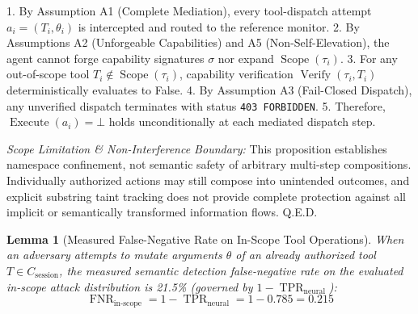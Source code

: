 \documentclass[10pt,journal,compsoc]{IEEEtran}
\begin{document}
\begin{IEEEproof}
1. By Assumption A1 (Complete Mediation), every tool-dispatch attempt $a_i = (T_i, \theta_i)$ is intercepted and routed to the reference monitor.
2. By Assumptions A2 (Unforgeable Capabilities) and A5 (Non-Self-Elevation), the agent cannot forge capability signatures $\sigma$ nor expand $\operatorname{Scope}(\tau_i)$.
3. For any out-of-scope tool $T_i \notin \operatorname{Scope}(\tau_i)$, capability verification $\operatorname{Verify}(\tau_i, T_i)$ deterministically evaluates to False.
4. By Assumption A3 (Fail-Closed Dispatch), any unverified dispatch terminates with status \texttt{403 FORBIDDEN}.
5. Therefore, $\operatorname{Execute}(a_i) = \bot$ holds unconditionally at each mediated dispatch step.

\textit{Scope Limitation \& Non-Interference Boundary:} This proposition establishes namespace confinement, not semantic safety of arbitrary multi-step compositions. Individually authorized actions may still compose into unintended outcomes, and explicit substring taint tracking does not provide complete protection against all implicit or semantically transformed information flows. Q.E.D.
\end{IEEEproof}

\newtheorem{lemma}{Lemma}
\begin{lemma}[Measured False-Negative Rate on In-Scope Tool Operations]
When an adversary attempts to mutate arguments $\theta$ of an already authorized tool $T \in C_{\text{session}}$, the measured semantic detection false-negative rate on the evaluated in-scope attack distribution is 21.5\% (governed by $1 - \operatorname{TPR}_{\text{neural}}$):
\begin{equation}
\operatorname{FNR}_{\text{in-scope}} = 1 - \operatorname{TPR}_{\text{neural}} = 1 - 0.785 = 0.215
\end{equation}
\end{lemma}
\end{document}
